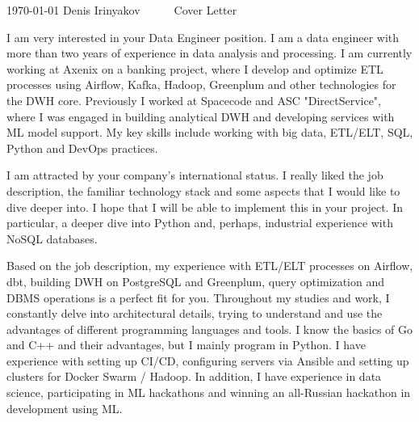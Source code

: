 \documentclass[11pt, a4paper]{../awesome-cv}
\begin{document}
\makecvheader[R]

\makecvfooter
  {\today}
  {Denis Irinyakov~~~\textperiodcentered~~~Cover Letter}
  {}

\makelettertitle

\begin{cvletter}

I am very interested in your Data Engineer position. I am a data engineer with more than two years of experience in data analysis and processing. I am currently working at Axenix on a banking project, where I develop and optimize ETL processes using Airflow, Kafka, Hadoop, Greenplum and other technologies for the DWH core. Previously I worked at Spacecode and ASC "DirectService", where I was engaged in building analytical DWH and developing services with ML model support. My key skills include working with big data, ETL/ELT, SQL, Python and DevOps practices.

I am attracted by your company's international status. I really liked the job description, the familiar technology stack and some aspects that I would like to dive deeper into. I hope that I will be able to implement this in your project. In particular, a deeper dive into Python and, perhaps, industrial experience with NoSQL databases.

Based on the job description, my experience with ETL/ELT processes on Airflow, dbt, building DWH on PostgreSQL and Greenplum, query optimization and DBMS operations is a perfect fit for you. Throughout my studies and work, I constantly delve into architectural details, trying to understand and use the advantages of different programming languages and tools. I know the basics of Go and C++ and their advantages, but I mainly program in Python. I have experience with setting up CI/CD, configuring servers via Ansible and setting up clusters for Docker Swarm / Hadoop. In addition, I have experience in data science, participating in ML hackathons and winning an all-Russian hackathon in development using ML.

\end{cvletter}

\makeletterclosing
\end{document}

